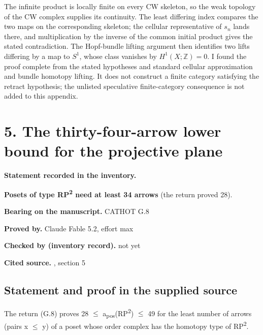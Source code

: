 The infinite product is locally finite on every CW skeleton, so the weak topology of the CW complex supplies its continuity. The least differing index compares the two maps on the corresponding skeleton; the cellular representative of $s_n$ lands there, and multiplication by the inverse of the common initial product gives the stated contradiction. The Hopf-bundle lifting argument then identifies two lifts differing by a map to $S^1$, whose class vanishes by $H^1(X;\mathbb Z)=0$. I found the proof complete from the stated hypotheses and standard cellular approximation and bundle homotopy lifting. It does not construct a finite category satisfying the retract hypothesis; the unlisted speculative finite-category consequence is not added to this appendix.

\par\bigskip

\section*{5. The thirty-four-arrow lower bound for the projective plane}


\label{nr:entry5}

\noindent\textbf{Statement recorded in the inventory.}\par\smallskip

\textbf{Posets of type RP\textsuperscript{2} need at least 34 arrows} (the return proved 28).


\noindent\textbf{Bearing on the manuscript.} CATHOT G.8\par\smallskip

\noindent\textbf{Proved by.} Claude Fable 5.2, effort max\par

\noindent\textbf{Checked by (inventory record).} not yet\par\smallskip

\noindent\textbf{Cited source.} , section 5\par\medskip

\subsection*{Statement and proof in the supplied source}

The return (G.8) proves 28 \ensuremath{\leq} a\textsubscript{pos}(RP\textsuperscript{2}) \ensuremath{\leq} 49 for the least number of arrows (pairs x \ensuremath{\leq} y) of a poset whose order complex has the homotopy type of RP\textsuperscript{2}.

